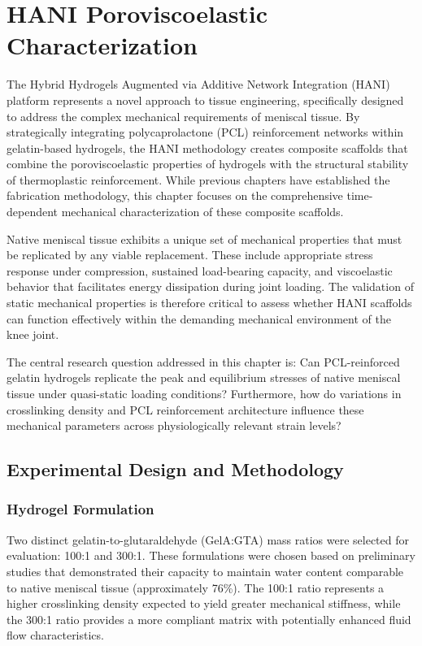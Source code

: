\chapter{HANI Poroviscoelastic Characterization}\label{chap:5}

The Hybrid Hydrogels Augmented via Additive Network Integration (HANI) platform represents a novel approach to tissue engineering, specifically designed to address the complex mechanical requirements of meniscal tissue. By strategically integrating polycaprolactone (PCL) reinforcement networks within gelatin-based hydrogels, the HANI methodology creates composite scaffolds that combine the poroviscoelastic properties of hydrogels with the structural stability of thermoplastic reinforcement. While previous chapters have established the fabrication methodology, this chapter focuses on the comprehensive time-dependent mechanical characterization of these composite scaffolds.

Native meniscal tissue exhibits a unique set of mechanical properties that must be replicated by any viable replacement. These include appropriate stress response under compression, sustained load-bearing capacity, and viscoelastic behavior that facilitates energy dissipation during joint loading. The validation of static mechanical properties is therefore critical to assess whether HANI scaffolds can function effectively within the demanding mechanical environment of the knee joint.

The central research question addressed in this chapter is: Can PCL-reinforced gelatin hydrogels replicate the peak and equilibrium stresses of native meniscal tissue under quasi-static loading conditions? Furthermore, how do variations in crosslinking density and PCL reinforcement architecture influence these mechanical parameters across physiologically relevant strain levels?

\section{Experimental Design and Methodology}
\subsection{Hydrogel Formulation}
Two distinct gelatin-to-glutaraldehyde (GelA:GTA) mass ratios were selected for evaluation: 100:1 and 300:1. These formulations were chosen based on preliminary studies that demonstrated their capacity to maintain water content comparable to native meniscal tissue (approximately 76\%). The 100:1 ratio represents a higher crosslinking density expected to yield greater mechanical stiffness, while the 300:1 ratio provides a more compliant matrix with potentially enhanced fluid flow characteristics.

